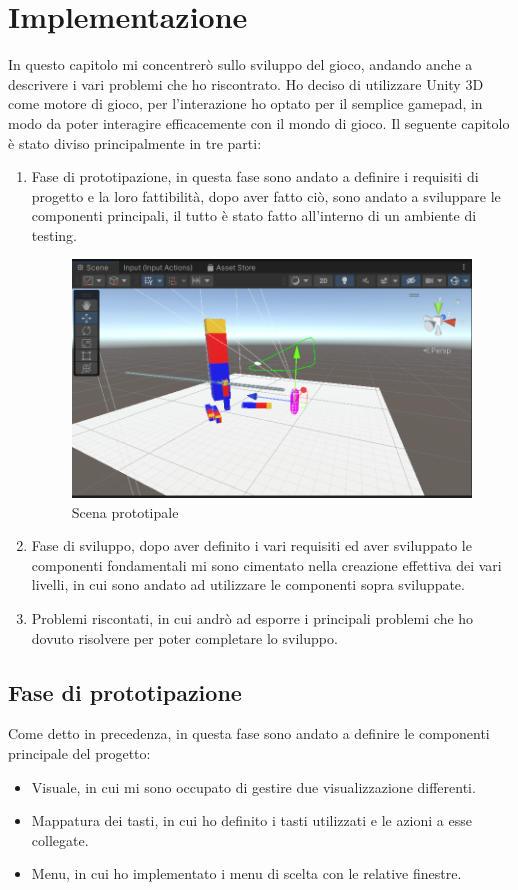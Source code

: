 \documentclass[
a4paper,
cleardoublepage=empty,
headings=twolinechapter,
numbers=autoenddot,
]{scrbook}
\begin{document}
    \chapter{Implementazione}
    In questo capitolo mi concentrerò sullo sviluppo del gioco, andando anche a descrivere i vari problemi che ho riscontrato.
    Ho deciso di utilizzare Unity 3D come motore di gioco, per l'interazione ho optato per il semplice gamepad, in modo da poter interagire efficacemente con il mondo di gioco.
    Il seguente capitolo è stato diviso principalmente in tre parti:
    \begin{enumerate}
        \item Fase di prototipazione, in questa fase sono andato a definire i requisiti di progetto e la loro fattibilità, dopo aver fatto ciò, sono andato a sviluppare le componenti principali, il tutto è stato fatto all'interno di un ambiente di testing.
        \begin{figure}[H]
        	\centering
        	\includegraphics[width=0.8\linewidth]{image/protot}
        	\caption{Scena prototipale}
        	\label{fig:protot}
        \end{figure}
        \item Fase di sviluppo, dopo aver definito i vari requisiti ed aver sviluppato le componenti fondamentali mi sono cimentato nella creazione effettiva dei vari livelli, in cui sono andato ad utilizzare le componenti sopra sviluppate.
        \item Problemi riscontati, in cui andrò ad esporre i principali problemi che ho dovuto risolvere per poter completare lo sviluppo.
    \end{enumerate}
    \section{Fase di prototipazione}
     Come detto in precedenza, in questa fase sono andato a definire le componenti principale del progetto:
     \begin{itemize}
     	\item Visuale, in cui mi sono occupato di gestire due visualizzazione differenti.
     	\item Mappatura dei tasti, in cui ho definito i tasti utilizzati e le azioni a esse collegate.
     	\item Menu, in cui ho implementato i menu di scelta con le relative finestre.
     \end{itemize}
\end{document}
